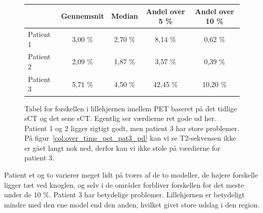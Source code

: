 \begin{figure}
    \centering
    \begin{tabular}{| l | c | c | c | c |}
        \hline
         & Gennemsnit & Median & Andel over 5 \% & Andel over 10 \% \\ \hline
        Patient 1 & 3,00 \% & 2,70 \% & 8,14 \% & 0,62 \% \\ \hline
        Patient 2 & 2,09 \% & 1,87 \% & 3,57 \% & 0,39 \% \\ \hline
        Patient 3 & 5,71 \% & 4,50 \% & 42,45 \% & 10,20 \% \\ \hline
    \end{tabular}
    \caption{Tabel for forskellen i lillehjernen imellem PET baseret på det tidlige sCT og det sene sCT. Egentlig ser værdierne ret gode ud her. Patient 1 og 2 ligger rigtigt godt, men patient 3 har store problemer. På figur~\ref{col:over_time_pet_pat3_pd} kan vi se T2-sekvensen ikke er gået langt nok ned, derfor kan vi ikke stole på værdierne for patient 3.}
    \label{tab:over_tid_lillehjerne}
\end{figure}

Patient et og to varierer meget lidt på tværs af de to modeller, de højere
forskelle ligger tæt ved knoglen, og selv i de områder forbliver
forskellen for det meste under de 10 \%. Patient 3 har betydelige
problemer. Lillehjernen er betydeligt mindre med den ene model end den
anden, hvilket givet store udslag i den region. 
